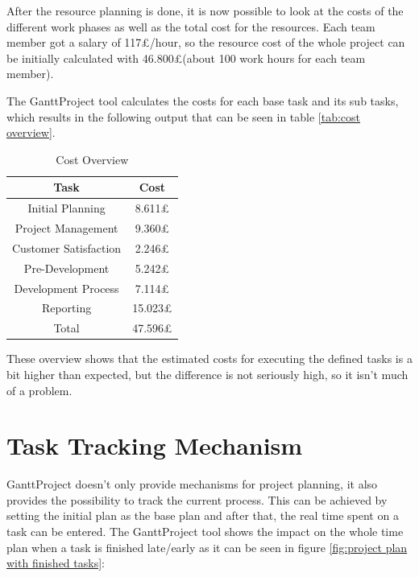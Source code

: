 After the resource planning is done, it is now possible to look at the costs of
the different work phases as well as the total cost for the resources. Each team
member got a salary of 117\pounds/hour, so the resource cost of the whole
project can be initially calculated with 46.800\pounds (about 100 work hours for
each team member).

The GanttProject tool calculates the costs for each base task and its sub tasks,
which results in the following output that can be seen in table \ref{tab:cost
overview}.

\begin{table}[h!]
  \centering
\begin{adjustbox}{max width=\textwidth}
\begin{tabular}{|c|c|}
Task&Cost\\
\hline
\rowcolor{lightgray}Initial Planning&8.611\pounds\\
Project Management&9.360\pounds\\
\rowcolor{lightgray}Customer Satisfaction&2.246\pounds\\
Pre-Development&5.242\pounds\\
\rowcolor{lightgray}Development Process&7.114\pounds\\
Reporting&15.023\pounds\\
\rowcolor{lightgray}Total&47.596\pounds\\
\hline
\end{tabular}
\end{adjustbox}
\captionsetup{justification=centering}
  \caption{Cost Overview}
  \label{tab:cost overview}
\end{table}

These overview shows that the estimated costs for executing the defined tasks is
a bit higher than expected, but the difference is not seriously high, so it
isn't much of a problem.

\section{Task Tracking Mechanism}

GanttProject doesn't only provide mechanisms for project planning, it also
provides the possibility to track the current process. This can be achieved by
setting the initial plan as the base plan and after that, the real time spent on
a task can be entered. The GanttProject tool shows the impact on the whole time
plan when a task is finished late/early as it can be seen in figure
\ref{fig:project plan with finished tasks}:

